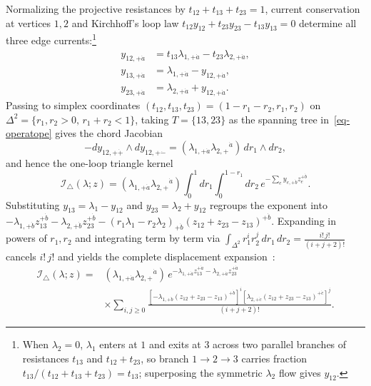 \documentclass[11pt]{article}
\numberwithin{equation}{section}
\numberwithin{figure}{section}
\numberwithin{table}{section}
\begin{document}
Normalizing the projective resistances by $t_{12}+t_{13}+t_{23}=1$, current conservation at vertices $1,2$ and Kirchhoff's loop law $t_{12}y_{12}+t_{23}y_{23}-t_{13}y_{13}=0$ determine all three edge currents:\footnote{When $\lambda_2=0$, $\lambda_1$ enters at $1$ and exits at $3$ across two parallel branches of resistances $t_{13}$ and $t_{12}+t_{23}$, so branch $1\to2\to3$ carries fraction $t_{13}/(t_{12}+t_{13}+t_{23})=t_{13}$; superposing the symmetric $\lambda_2$ flow gives $y_{12}$.}
\begin{equation}\label{eq-triangle-current}
\begin{aligned}
y_{12,+\dot a}&=t_{13}\lambda_{1,+\dot a}-t_{23}\lambda_{2,+\dot a},\\
y_{13,+\dot a}&=\lambda_{1,+\dot a}-y_{12,+\dot a},\\
y_{23,+\dot a}&=\lambda_{2,+\dot a}+y_{12,+\dot a}.
\end{aligned}
\end{equation}
Passing to simplex coordinates $(t_{12},t_{13},t_{23})=(1-r_1-r_2,r_1,r_2)$ on $\Delta^2=\{r_1,r_2>0,\,r_1+r_2<1\}$, taking $T=\{13,23\}$ as the spanning tree in~\eqref{eq-operatope} gives the chord Jacobian
\begin{equation}\label{b-00267}
-dy_{12,+\dot+}\wedge dy_{12,+\dot-}
=(\lambda_{1,+\dot a}\lambda_{2,+}{}^{\dot a})\,dr_1\wedge dr_2,
\end{equation}
and hence the one-loop triangle kernel
\begin{equation}\label{eq-1-25}
\mathcal I_\triangle(\lambda;z)
=(\lambda_{1,+\dot a}\lambda_{2,+}{}^{\dot a})
\int_0^1dr_1\int_0^{1-r_1}dr_2\,
e^{-\sum_e y_{e,+\dot b}z_e^{+\dot b}}.
\end{equation}
Substituting $y_{13}=\lambda_1-y_{12}$ and $y_{23}=\lambda_2+y_{12}$ regroups the exponent into $-\lambda_{1,+\dot b}z_{13}^{+\dot b}-\lambda_{2,+\dot b}z_{23}^{+\dot b}-(r_1\lambda_1-r_2\lambda_2)_{+\dot b}(z_{12}+z_{23}-z_{13})^{+\dot b}$. Expanding in powers of $r_1,r_2$ and integrating term by term via $\int_{\Delta^2}r_1^ir_2^j\,dr_1\,dr_2=\frac{i!\,j!}{(i+j+2)!}$ cancels $i!\,j!$ and yields the complete displacement expansion~\cite[Eq.~(2.47)]{BK}:
\begin{equation}\label{eq-1-46}
\begin{aligned}
\mathcal I_\triangle(\lambda;z)
={}&(\lambda_{1,+\dot a}\lambda_{2,+}{}^{\dot a})\,
 e^{-\lambda_{1,+\dot a}z_{13}^{+\dot a}-\lambda_{2,+\dot a}z_{23}^{+\dot a}}\\
&\times\sum_{i,j\ge0}
\frac{[-\lambda_{1,+\dot b}(z_{12}+z_{23}-z_{13})^{+\dot b}]^i
[\lambda_{2,+\dot c}(z_{12}+z_{23}-z_{13})^{+\dot c}]^j}{(i+j+2)!}.
\end{aligned}
\end{equation}
\end{document}
